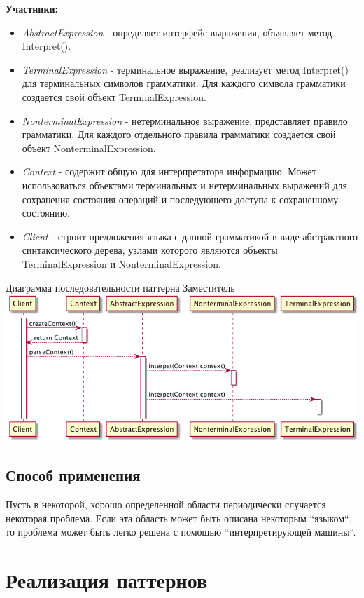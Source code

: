 \documentclass[PI,LAB]{HSEUniversity}
\begin{document}
\textbf{Участники:}
\begin{itemize}
    \item \emph{AbstractExpression} - определяет интерфейс выражения, объявляет метод Interpret().
    \item \emph{TerminalExpression} - терминальное выражение, реализует метод Interpret() для терминальных символов грамматики. Для каждого символа грамматики создается свой объект TerminalExpression.
    \item \emph{NonterminalExpression} -  нетерминальное выражение, представляет правило грамматики. Для каждого отдельного правила грамматики создается свой объект NonterminalExpression.
    \item \emph{Context} - содержит общую для интерпретатора информацию. Может использоваться объектами терминальных и нетерминальных выражений для сохранения состояния операций и последующего доступа к сохраненному состоянию.
    \item \emph{Client} - строит предложения языка с данной грамматикой в виде абстрактного синтаксического дерева, узлами которого являются объекты TerminalExpression и NonterminalExpression.
\end{itemize}

\begin{FIGURE}[h]{Диаграмма последовательности паттерна Заместитель\label{fig:example-figure}}
    \includegraphics[width=1\textwidth]{../out/diagrams/interpreter/interpreter-default}
\end{FIGURE}

\section{Способ применения}
Пусть в некоторой, хорошо определенной области периодически случается некоторая проблема. Если эта область может быть описана некоторым “языком“, то проблема может быть легко решена с помощью “интерпретирующей машины“.
\chapter{Реализация паттернов}
\end{document}
